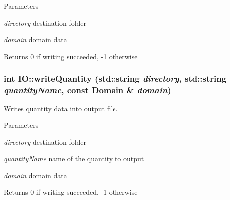 \begin{DoxyParams}{Parameters}
\item[{\em directory}]destination folder \item[{\em domain}]domain data\end{DoxyParams}
\begin{DoxyReturn}{Returns}
0 if writing succeeded, -\/1 otherwise 
\end{DoxyReturn}
\hypertarget{namespaceIO_a98f43edfc02e8c62ca9f005a9994ab69}{
\subsubsection[{writeQuantity}]{\setlength{\rightskip}{0pt plus 5cm}int IO::writeQuantity (std::string {\em directory}, \/  std::string {\em quantityName}, \/  const {\bf Domain} \& {\em domain})}}
\label{namespaceIO_a98f43edfc02e8c62ca9f005a9994ab69}


Writes quantity data into output file. 
\begin{DoxyParams}{Parameters}
\item[{\em directory}]destination folder \item[{\em quantityName}]name of the quantity to output \item[{\em domain}]domain data\end{DoxyParams}
\begin{DoxyReturn}{Returns}
0 if writing succeeded, -\/1 otherwise 
\end{DoxyReturn}
